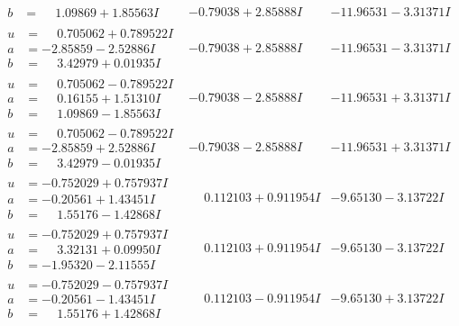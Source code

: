\documentclass[1p]{elsarticle_modified}
\theoremstyle{definition}
\begin{document}
$$\begin{array}{c|c|c}
\begin{aligned}
b &= \phantom{-}1.09869 + 1.85563 I\end{aligned}
 & -0.79038 + 2.85888 I & -11.96531 - 3.31371 I \\ \hline\begin{aligned}
u &= \phantom{-}0.705062 + 0.789522 I \\
a &= -2.85859 - 2.52886 I \\
b &= \phantom{-}3.42979 + 0.01935 I\end{aligned}
 & -0.79038 + 2.85888 I & -11.96531 - 3.31371 I \\ \hline\begin{aligned}
u &= \phantom{-}0.705062 - 0.789522 I \\
a &= \phantom{-}0.16155 + 1.51310 I \\
b &= \phantom{-}1.09869 - 1.85563 I\end{aligned}
 & -0.79038 - 2.85888 I & -11.96531 + 3.31371 I \\ \hline\begin{aligned}
u &= \phantom{-}0.705062 - 0.789522 I \\
a &= -2.85859 + 2.52886 I \\
b &= \phantom{-}3.42979 - 0.01935 I\end{aligned}
 & -0.79038 - 2.85888 I & -11.96531 + 3.31371 I \\ \hline\begin{aligned}
u &= -0.752029 + 0.757937 I \\
a &= -0.20561 + 1.43451 I \\
b &= \phantom{-}1.55176 - 1.42868 I\end{aligned}
 & \phantom{-}0.112103 + 0.911954 I & -9.65130 - 3.13722 I \\ \hline\begin{aligned}
u &= -0.752029 + 0.757937 I \\
a &= \phantom{-}3.32131 + 0.09950 I \\
b &= -1.95320 - 2.11555 I\end{aligned}
 & \phantom{-}0.112103 + 0.911954 I & -9.65130 - 3.13722 I \\ \hline\begin{aligned}
u &= -0.752029 - 0.757937 I \\
a &= -0.20561 - 1.43451 I \\
b &= \phantom{-}1.55176 + 1.42868 I\end{aligned}
 & \phantom{-}0.112103 - 0.911954 I & -9.65130 + 3.13722 I \\ \hline\begin{aligned}

\end{aligned}
\end{array}$$
\end{document}
